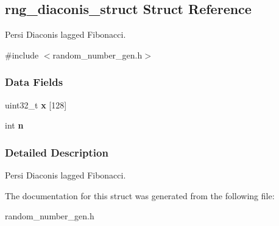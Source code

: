 \hypertarget{structrng__diaconis__struct}{}\subsection{rng\+\_\+diaconis\+\_\+struct Struct Reference}
\label{structrng__diaconis__struct}


Persi Diaconis\textquotesingle{} lagged Fibonacci.  




{\ttfamily \#include $<$random\+\_\+number\+\_\+gen.\+h$>$}

\subsubsection*{Data Fields}
\begin{DoxyCompactItemize}
\item 
\mbox{\label{structrng__diaconis__struct_a7dd3e9b29bc7b2bfad09c27c36dea94d}} 
uint32\+\_\+t {\bfseries x} \mbox{[}128\mbox{]}
\item 
\mbox{\label{structrng__diaconis__struct_adb2691d0b3abf19d68365a660223ba68}} 
int {\bfseries n}
\end{DoxyCompactItemize}


\subsubsection{Detailed Description}
Persi Diaconis\textquotesingle{} lagged Fibonacci. 

The documentation for this struct was generated from the following file\+:\begin{DoxyCompactItemize}
\item 
random\+\_\+number\+\_\+gen.\+h\end{DoxyCompactItemize}
